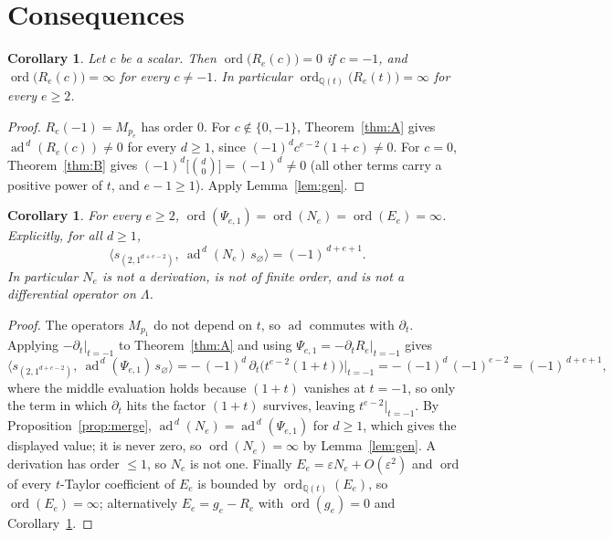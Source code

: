 \documentclass[11pt]{article}
\theoremstyle{plain}
\newtheorem{corollary}[theorem]{Corollary}
\theoremstyle{definition}
\DeclareMathOperator{\ord}{ord}
\DeclareMathOperator{\ad}{ad}
\newcommand{\LL}{\Lambda}
\newcommand{\eps}{\varepsilon}
\newcommand{\Q}{\mathbb{Q}}
\begin{document}
\section{Consequences}

\begin{corollary}\label{cor:ordR}
Let $c$ be a scalar.  Then $\ord\bigl(R_e(c)\bigr)=0$ if $c=-1$, and
$\ord\bigl(R_e(c)\bigr)=\infty$ for every $c\neq-1$.  In particular
$\ord_{\Q(t)}\bigl(R_e(t)\bigr)=\infty$ for every $e\ge2$.
\end{corollary}

\begin{proof}
$R_e(-1)=M_{p_e}$ has order $0$.  For $c\notin\{0,-1\}$, Theorem~\ref{thm:A}
gives $\ad^{\,d}(R_e(c))\neq0$ for every $d\ge1$, since
$(-1)^dc^{e-2}(1+c)\neq0$.  For $c=0$, Theorem~\ref{thm:B} gives
$(-1)^d\bigl[\binom d0\bigr]=(-1)^d\neq0$ (all other terms carry a positive
power of $t$, and $e-1\ge1$).  Apply Lemma~\ref{lem:gen}.
\end{proof}

\begin{corollary}\label{cor:ordN}
For every $e\ge2$, $\ord(\Psi_{e,1})=\ord(N_e)=\ord(E_e)=\infty$.  Explicitly,
for all $d\ge1$,
\[
  \bigl\langle s_{(2,1^{d+e-2})},\ \ad^{\,d}(N_e)\,s_\varnothing\bigr\rangle
  =(-1)^{\,d+e+1}.
\]
In particular $N_e$ is not a derivation, is not of finite order, and is not a
differential operator on $\LL$.
\end{corollary}

\begin{proof}
The operators $M_{p_1}$ do not depend on $t$, so $\ad$ commutes with
$\partial_t$.  Applying $-\partial_t|_{t=-1}$ to Theorem~\ref{thm:A} and using
$\Psi_{e,1}=-\partial_tR_e|_{t=-1}$ gives
\[
  \bigl\langle s_{(2,1^{d+e-2})},\ \ad^{\,d}(\Psi_{e,1})\,s_\varnothing\bigr\rangle
  =-\,(-1)^{d}\,\partial_t\bigl(t^{e-2}(1+t)\bigr)\Big|_{t=-1}
  =-\,(-1)^{d}\,(-1)^{e-2}=(-1)^{\,d+e+1},
\]
where the middle evaluation holds because $(1+t)$ vanishes at $t=-1$, so only
the term in which $\partial_t$ hits the factor $(1+t)$ survives, leaving
$t^{e-2}|_{t=-1}$.
By Proposition~\ref{prop:merge}, $\ad^{\,d}(N_e)=\ad^{\,d}(\Psi_{e,1})$ for
$d\ge1$, which gives the displayed value; it is never zero, so
$\ord(N_e)=\infty$ by Lemma~\ref{lem:gen}.  A derivation has order $\le1$, so
$N_e$ is not one.  Finally $E_e=\eps N_e+O(\eps^2)$ and $\ord$ of every
$t$-Taylor coefficient of $E_e$ is bounded by $\ord_{\Q(t)}(E_e)$, so
$\ord(E_e)=\infty$; alternatively $E_e=g_e-R_e$ with $\ord(g_e)=0$ and
Corollary~\ref{cor:ordR}.
\end{proof}
\end{document}
